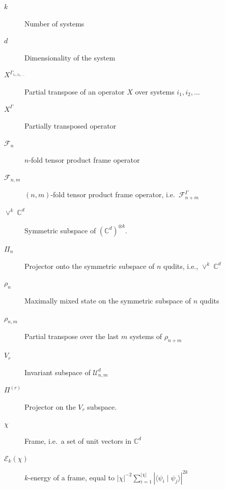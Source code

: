 \documentclass[aps,twocolumn,pra,superscriptaddress,nofootinbib]{revtex4-2}
\DeclareMathOperator{\C}{\mathbb{C}} %
\begin{document}
\begin{description}
  \item[$k$] Number of systems
  \item[$d$] Dimensionality of the system
  \item[$X^{\mathsf{\Gamma}_{i_{1},i_{2},\dots}}$] Partial transpose of an operator $X$ over systems $i_{1},i_{2},\dots$
  \item[$X^{\mathsf{\Gamma}}$] Partially transposed operator
  \item[$\mathcal{F}_{n}$] $n$-fold tensor product frame operator
  \item[$\mathcal{F}_{n,m}$] $(n,m)$-fold tensor product frame operator, i.e.\ $\mathcal{F}^{\mathsf{\Gamma}}_{n+m}$
  \item [$\vee^{k}\C^d$] Symmetric subspace of $(\mathbb{C}^{d})^{\otimes k}$. 
  \item[$\Pi_n$] Projector onto the symmetric subspace of $n$ qudits, i.e., $\vee^{k}\C^d$
  \item[$\rho_n$] Maximally mixed state on the symmetric subspace of $n$ qudits
  \item[$\rho_{n,m}$] Partial transpose over the last $m$ systems of $\rho_{n+m}$
  \item[$V_r$] Invariant subspace of $\mathcal{U}_{n,m}^{d}$
  \item[$\Pi^{(r)}$] Projector on the $V_{r}$ subspace.
  \item[$\chi$] Frame, i.e.\ a set of unit vectors in $\mathbb{C}^d$
  \item[$\mathcal{E}_k(\chi)$] $k$-energy of a frame, equal to
  $|\chi|^{-2}\sum_{i=1}^{|\chi|}|\langle\psi_i\mid\psi_j\rangle|^{2k}$
\end{description}
\end{document}
